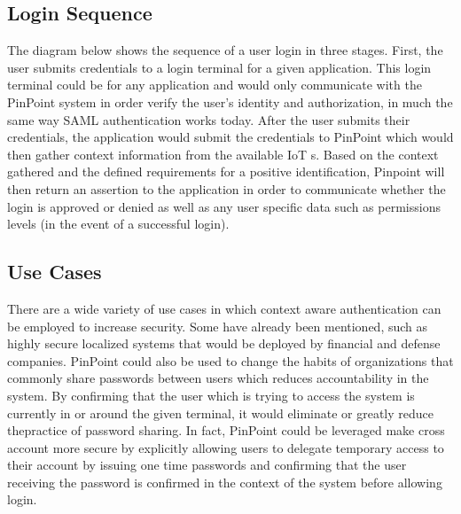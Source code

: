 \documentclass[11pt,journal]{IEEEtran}
\begin{document}
\subsection{Login Sequence}
The diagram below shows the sequence of a user login in three stages. First, the user submits credentials to a login terminal for a given application. This login terminal could be for any application and would only communicate with the PinPoint system in order verify the user’s identity and authorization, in much the same way SAML authentication works today. After the user submits their credentials, the application would submit the credentials to PinPoint which would then gather context information from the available IoT s. Based on the context gathered and the defined requirements for a positive identification, Pinpoint will then return an assertion to the application in order to communicate whether the login is approved or denied as well as any user specific data such as permissions levels (in the event of a successful login).

\subsection{Use Cases}
There are a wide variety of use cases in which context aware authentication can be employed to increase security. Some have already been mentioned, such as highly secure localized systems that would be deployed by financial and defense companies. PinPoint could also be used to change the habits of organizations that commonly share passwords between users which reduces accountability in the system. By confirming that the user which is trying to access the system is currently in or around the given terminal, it would eliminate or greatly reduce thepractice of password sharing. In fact, PinPoint could be leveraged make cross account more secure by explicitly allowing users to delegate temporary access to their account by issuing one time passwords and confirming that the user receiving the password is confirmed in the context of the system before allowing login.
\end{document}
